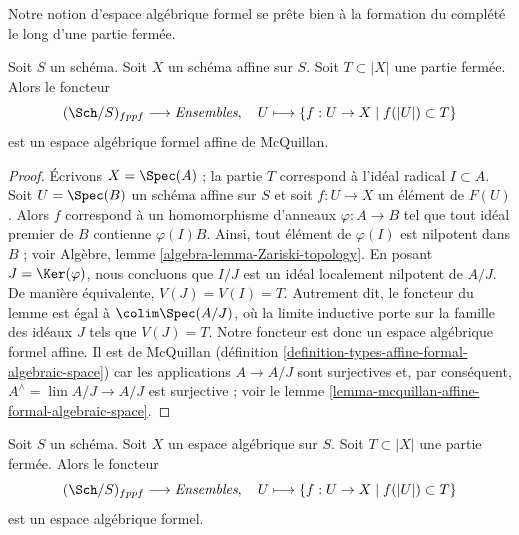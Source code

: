 \noindent
Notre notion d'espace algébrique formel se prête bien à la formation du
complété le long d'une partie fermée.

\begin{lemma}
\label{lemma-completion-affine-is-affine-formal-algebraic-space}
Soit $S$ un schéma. Soit $X$ un schéma affine sur $S$.
Soit $T \subset |X|$ une partie fermée. Alors le foncteur
$$
(\Sch/S)_{fppf} \longrightarrow \textit{Ensembles},\quad
U \longmapsto \{f : U \to X \mid f(|U|) \subset T\}
$$
est un espace algébrique formel affine de McQuillan.
\end{lemma}

\begin{proof}
Écrivons $X = \Spec(A)$ ; la partie $T$ correspond à l'idéal radical $I \subset A$.
Soit $U = \Spec(B)$ un schéma affine sur $S$ et soit
$f : U \to X$ un élément de $F(U)$. Alors $f$ correspond à un
homomorphisme d'anneaux $\varphi : A \to B$ tel que tout idéal premier de $B$ contienne
$\varphi(I) B$. Ainsi, tout élément de $\varphi(I)$ est nilpotent dans $B$ ; voir
Algèbre, lemme \ref{algebra-lemma-Zariski-topology}.
En posant $J = \Ker(\varphi)$, nous concluons que $I/J$ est un idéal localement
nilpotent de $A/J$. De manière équivalente, $V(J) = V(I) = T$.
Autrement dit, le foncteur du lemme est égal à
$\colim \Spec(A/J)$, où la limite inductive porte sur la
famille des idéaux $J$ tels que $V(J) = T$.
Notre foncteur est donc un espace algébrique formel affine. Il est de McQuillan
(définition \ref{definition-types-affine-formal-algebraic-space})
car les applications $A \to A/J$ sont surjectives
et, par conséquent, $A^\wedge = \lim A/J \to A/J$ est surjective ; voir le
lemme \ref{lemma-mcquillan-affine-formal-algebraic-space}.
\end{proof}

\begin{lemma}
\label{lemma-completion-is-formal-algebraic-space}
Soit $S$ un schéma. Soit $X$ un espace algébrique sur $S$.
Soit $T \subset |X|$ une partie fermée. Alors le foncteur
$$
(\Sch/S)_{fppf} \longrightarrow \textit{Ensembles},\quad
U \longmapsto \{f : U \to X \mid f(|U|) \subset T\}
$$
est un espace algébrique formel.
\end{lemma}

